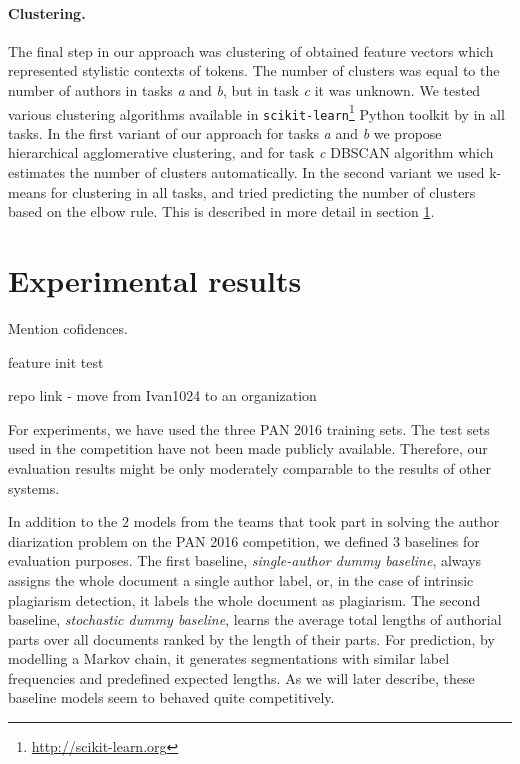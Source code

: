\documentclass[10pt, a4paper]{article}
\begin{document}
\paragraph{Clustering.}
The final step in our approach was clustering of obtained feature vectors which represented stylistic contexts of tokens. The number of clusters was equal to the number of authors in tasks \emph{a} and \emph{b}, but in task \emph{c} it was unknown. We tested various clustering algorithms available in \texttt{scikit-learn}\footnote{\url{http://scikit-learn.org}} Python toolkit by \citet{scikit-learn} in all tasks. In the first variant of our approach for tasks  \emph{a} and \emph{b} we propose hierarchical agglomerative clustering, and for task \emph{c} DBSCAN algorithm which estimates the number of clusters automatically. In the second variant we used k-means for clustering in all tasks, and tried predicting the number of clusters based on the elbow rule. This is described in more detail in section \ref{sec:experimental-results}.



\section{Experimental results} \label{sec:experimental-results}

Mention cofidences.

feature init test

repo link - move from Ivan1024 to an organization

For experiments, we have used the three PAN 2016 training sets. The test sets used in the competition have not been made publicly available. Therefore, our evaluation results might be only moderately comparable to the results of other systems.

In addition to the $2$ models from the teams that took part in solving the author diarization problem on the PAN 2016 competition, we defined $3$ baselines for evaluation purposes. The first baseline, \emph{single-author dummy baseline}, always assigns the whole document a single author label, or, in the case of intrinsic plagiarism detection, it labels the whole document as plagiarism. The second baseline, \emph{stochastic dummy baseline}, learns the average total lengths of authorial parts over all documents ranked by the length of their parts. For prediction, by modelling a Markov chain, it generates segmentations with similar label frequencies and predefined expected lengths. As we will later describe, these baseline models seem to behaved quite competitively.
\end{document}
